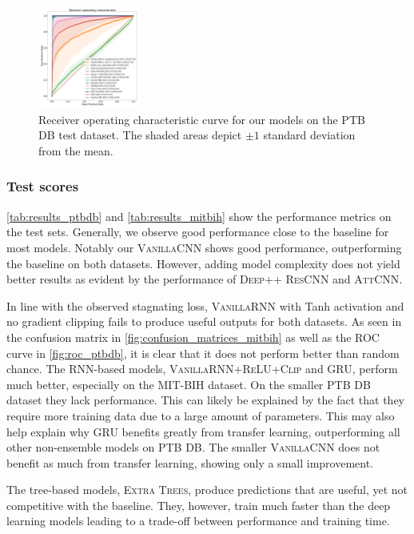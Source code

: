 \begin{figure}[]
    \centering
    \includegraphics[width=0.3\textwidth]{figures/roc_ptbdb.png}
    \caption{Receiver operating characteristic curve for our models on the PTB DB test dataset. The shaded areas depict \boldmath$\pm 1$ standard deviation from the mean.}
    \label{fig:roc_ptbdb}
\end{figure}

\subsubsection{Test scores}
\autoref{tab:results_ptbdb} and \autoref{tab:results_mitbih} show the performance metrics on the test sets. Generally, we observe good performance close to the baseline for most models. Notably our \textsc{VanillaCNN} shows good performance, outperforming the baseline on both datasets. However, adding model complexity does not yield better results as evident by the performance of \textsc{Deep++ ResCNN} and \textsc{AttCNN}.

In line with the observed stagnating loss, \textsc{VanillaRNN} with Tanh activation and no gradient clipping fails to produce useful outputs for both datasets. As seen in the confusion matrix in \autoref{fig:confusion_matrices_mitbih} as well as the ROC curve in \autoref{fig:roc_ptbdb}, it is clear that it does not perform better than random chance. The RNN-based models, \textsc{VanillaRNN+ReLU+Clip} and \textsc{GRU}, perform much better, especially on the MIT-BIH dataset. On the smaller PTB DB dataset they lack performance. This can likely be explained by the fact that they require more training data due to a large amount of parameters. This may also help explain why \textsc{GRU} benefits greatly from transfer learning, outperforming all other non-ensemble models on PTB DB. The smaller \textsc{VanillaCNN} does not benefit as much from transfer learning, showing only a small improvement.

The tree-based models, \textsc{Extra Trees}, produce predictions that are useful, yet not competitive with the baseline. They, however, train much faster than the deep learning models leading to a trade-off between performance and training time.


